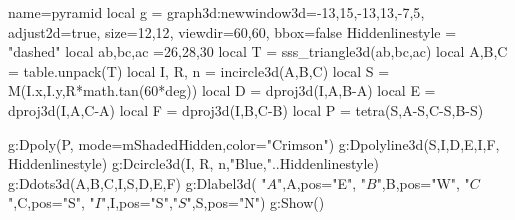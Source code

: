 \documentclass[12pt]{standalone}
\begin{document}
\begin{luadraw}{name=pyramid}
local g = graph3d:new{window3d={-13,15,-13,13,-7,5}, adjust2d=true, size={12,12}, viewdir={60,60}, bbox=false}
Hiddenlinestyle = "dashed"
local ab,bc,ac =26,28,30
local T =  sss_triangle3d(ab,bc,ac)
local A,B,C = table.unpack(T)
local I, R, n = incircle3d(A,B,C)
local S = M(I.x,I.y,R*math.tan(60*deg))
local D = dproj3d(I,{A,B-A})
local E = dproj3d(I,{A,C-A})
local F = dproj3d(I,{B,C-B})
local P = tetra(S,A-S,C-S,B-S)

g:Dpoly(P, {mode=mShadedHidden,color="Crimson"})
g:Dpolyline3d({{S,I,D},{E,I,F}}, Hiddenlinestyle)
g:Dcircle3d(I, R, n,"Blue,"..Hiddenlinestyle)
g:Ddots3d({A,B,C,I,S,D,E,F})
g:Dlabel3d( "$A$",A,{pos="E"}, "$B$",B,{pos="W"}, "$C$",C,{pos="S"}, 
"$I$",I,{pos="S"},"$S$",S,{pos="N"})
g:Show()
\end{luadraw}
\end{document}
